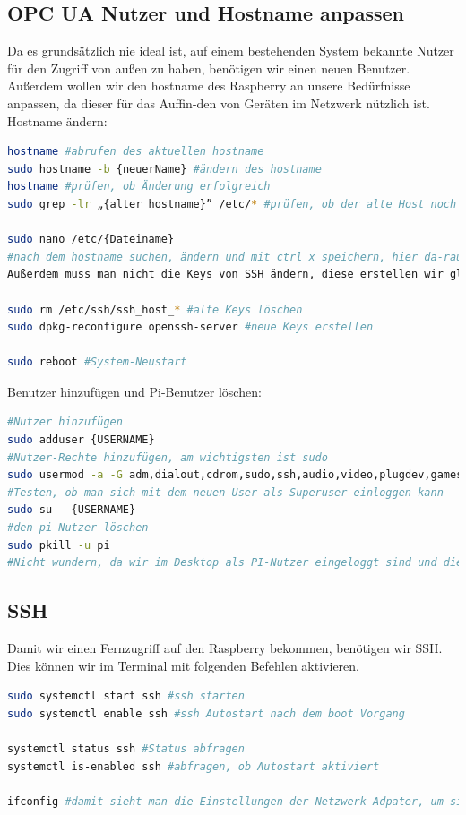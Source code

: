 \subsection{OPC UA Nutzer und Hostname anpassen}
Da es grundsätzlich nie ideal ist, auf einem bestehenden System bekannte Nutzer für den Zugriff von außen zu haben, benötigen wir einen neuen Benutzer. Außerdem wollen wir den hostname des Raspberry an unsere Bedürfnisse anpassen, da dieser für das Auffin-den von Geräten im Netzwerk nützlich ist.
Hostname ändern:
\begin{lstlisting}[language=Bash]
hostname #abrufen des aktuellen hostname
sudo hostname -b {neuerName} #ändern des hostname
hostname #prüfen, ob Änderung erfolgreich
sudo grep -lr „{alter hostname}” /etc/* #prüfen, ob der alte Host noch in anderen Konfiguratonsdateien verzeichnet ist

sudo nano /etc/{Dateiname}
#nach dem hostname suchen, ändern und mit ctrl x speichern, hier da-rauf achten, dass man keine Dateien ändern muss, wo in der Zeichenkette der hostname auftaucht(Bsp. raspi.list, hier findet man http.//archive.raspberrypi.org/debian/ das natürlich nicht ändern)
Außerdem muss man nicht die Keys von SSH ändern, diese erstellen wir gleich neu mit folgenden Befehlen

sudo rm /etc/ssh/ssh_host_* #alte Keys löschen
sudo dpkg-reconfigure openssh-server #neue Keys erstellen

sudo reboot #System-Neustart
\end{lstlisting}


Benutzer hinzufügen und Pi-Benutzer löschen:
\begin{lstlisting}[language=Bash]
#Nutzer hinzufügen
sudo adduser {USERNAME}
#Nutzer-Rechte hinzufügen, am wichtigsten ist sudo
sudo usermod -a -G adm,dialout,cdrom,sudo,ssh,audio,video,plugdev,games,users,input,netdev,gpio,i2c,spi {USERNAME}
#Testen, ob man sich mit dem neuen User als Superuser einloggen kann
sudo su – {USERNAME}
#den pi-Nutzer löschen
sudo pkill -u pi
#Nicht wundern, da wir im Desktop als PI-Nutzer eingeloggt sind und diesen gerade löschten, werden wir abgemeldet und gefragt, ob wir uns als {USERNAME} Nutzer einloggen wollen
\end{lstlisting}
\subsection{SSH}
Damit wir einen Fernzugriff auf den Raspberry bekommen, benötigen wir SSH. Dies können wir im Terminal mit folgenden Befehlen aktivieren.
\begin{lstlisting}[language=Bash]
sudo systemctl start ssh #ssh starten
sudo systemctl enable ssh #ssh Autostart nach dem boot Vorgang

systemctl status ssh #Status abfragen
systemctl is-enabled ssh #abfragen, ob Autostart aktiviert

ifconfig #damit sieht man die Einstellungen der Netzwerk Adpater, um sich für später die IP-Adresse (inet) des wlan0-Adpaters zu merken.
\end{lstlisting}

